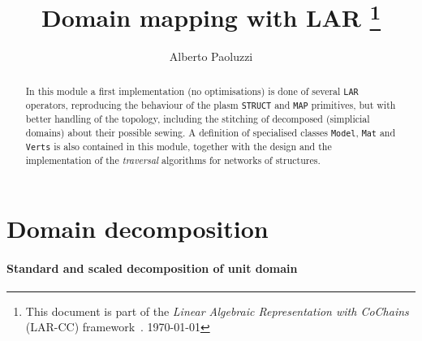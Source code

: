 \documentclass[11pt,oneside]{article}	%
\title{Domain mapping with LAR
\footnote{This document is part of the \emph{Linear Algebraic Representation with CoChains} (LAR-CC) framework~\cite{cclar-proj:2013:00}. \today}
}
\author{Alberto Paoluzzi}
\begin{document}
\maketitle
\nonstopmode

\begin{abstract}
In this module a first implementation (no optimisations) is done of several \texttt{LAR} operators, reproducing the behaviour of the plasm  \texttt{STRUCT} and \texttt{MAP} primitives, but with better handling of the topology, including the stitching of decomposed (simplicial domains) about their possible sewing. A definition of specialised classes \texttt{Model}, \texttt{Mat} and \texttt{Verts} is also contained in this module, together with the design and the implementation of the \emph{traversal} algorithms for networks of structures.
\end{abstract}

\tableofcontents

\section{Domain decomposition}

\paragraph{Standard and scaled decomposition of unit domain}
\end{document}
